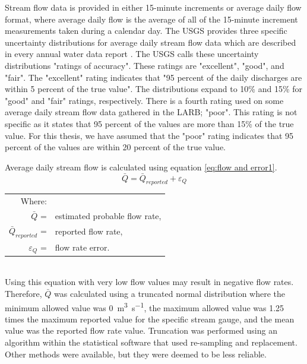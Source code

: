 \begin{linenumbers}
Stream flow data is provided in either 15-minute increments or average daily flow format, where average daily flow is the average of all of the 15-minute increment measurements taken during a calendar day.  The USGS provides three specific uncertainty distributions for average daily stream flow data which are described in every annual water data report \parencite{USGS2006NWIS, USGS2007NWIS, USGS2008NWIS, USGS2009NWIS, USGS2010NWIS, USGS2011NWIS, USGS2012NWIS}.  The USGS calls these uncertainty distributions "ratings of accuracy".  These ratings are "excellent", "good", and "fair".  The "excellent" rating indicates that "95 percent of the daily discharges are within 5 percent of the true value".  The distributions expand to 10\% and 15\% for "good" and "fair" ratings, respectively.  There is a fourth rating used on some average daily stream flow data gathered in the LARB; "poor".  This rating is not specific as it states that 95 percent of the values are more than 15\% of the true value.  For this thesis, we have assumed that the "poor" rating indicates that 95 percent of the values are within 20 percent of the true value.

Average daily stream flow is calculated using equation \ref{eq:flow and error1}.   
\begin{equation}
\label{eq:flow and error1}
	\bar{Q}=\bar{Q}_{reported}+\varepsilon_Q
\end{equation}
\begin{tabular}{r l}
Where:&\\
$\bar{Q}$ =& estimated probable flow rate,\\
$\bar{Q}_{reported}$ =& reported flow rate,\\
$\varepsilon_Q$ =& flow rate error.\\
\end{tabular}\\

Using this equation with very low flow values may result in negative flow rates.  Therefore, $\bar{Q}$ was calculated using a truncated normal distribution where the minimum allowed value was \SI{0}{\cubic\meter\per\second}, the maximum allowed value was 1.25 times the maximum reported value for the specific stream gauge, and the mean value was the reported flow rate value.  Truncation was performed using an algorithm within the statistical software that used re-sampling and replacement.  Other methods were available, but they were deemed to be less reliable.


\end{linenumbers}
